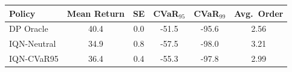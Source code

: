 \begin{tabular}{lccccc}
\hline
Policy & Mean Return & SE & CVaR$_{95}$ & CVaR$_{99}$ & Avg.\ Order \\
\hline
DP Oracle & 40.4 & 0.0 & -51.5 & -95.6 & 2.56 \\
IQN-Neutral & 34.9 & 0.8 & -57.5 & -98.0 & 3.21 \\
IQN-CVaR95 & 36.4 & 0.4 & -55.3 & -97.8 & 2.99 \\
\hline
\end{tabular}
